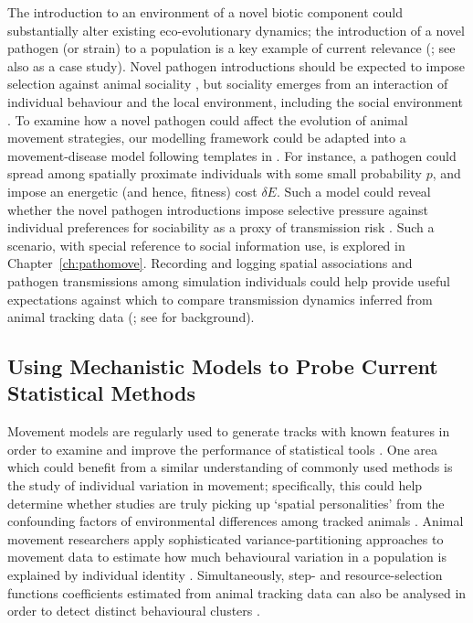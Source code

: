 The introduction to an environment of a novel biotic component could substantially alter existing eco-evolutionary dynamics; the introduction of a novel pathogen (or strain) to a population is a key example of current relevance (\cite{carlson2022a}; see also \cite{monk2022} as a case study).
Novel pathogen introductions should be expected to impose selection against animal sociality \parencite[e.g.][]{ashby2022}, but sociality emerges from an interaction of individual behaviour and the local environment, including the social environment \parencite{tanner2012}.
To examine how a novel pathogen could affect the evolution of animal movement strategies, our modelling framework could be adapted into a movement-disease model following templates in \textcite{white2018a}.
For instance, a pathogen could spread among spatially proximate individuals with some small probability $p$, and impose an energetic (and hence, fitness) cost $\delta E$.
Such a model could reveal whether the novel pathogen introductions impose selective pressure against individual preferences for sociability as a proxy of transmission risk \parencite{weinstein2018}.
Such a scenario, with special reference to social information use, is explored in Chapter~\ref{ch:pathomove}.
Recording and logging spatial associations and pathogen transmissions among simulation individuals could help provide useful expectations against which to compare transmission dynamics inferred from animal tracking data (\cite{wilber2022}; see \cite{robitaille2019,albery2021} for background).

\subsection*{Using Mechanistic Models to Probe Current Statistical Methods}

Movement models are regularly used to generate tracks with known features in order to examine and improve the performance of statistical tools \parencite[such as segmentation algorithms; see e.g.][]{gurarie2016,michelot2016,patin2020a}.
One area which could benefit from a similar understanding of commonly used methods is the study of individual variation in movement; specifically, this could help determine whether studies are truly picking up `spatial personalities' from the confounding factors of environmental differences among tracked animals \parencite{stuber2022,spiegel2022}.
Animal movement researchers apply sophisticated variance-partitioning approaches to movement data to estimate how much behavioural variation in a population is explained by individual identity \parencite[especially using `repeatability analysis'][]{hertel2020, hertel2019, hertel2021,nakagawa2010}.
Simultaneously, step- and resource-selection functions coefficients estimated from animal tracking data can also be analysed in order to detect distinct behavioural clusters \parencite{bastille-rousseau2019}.

